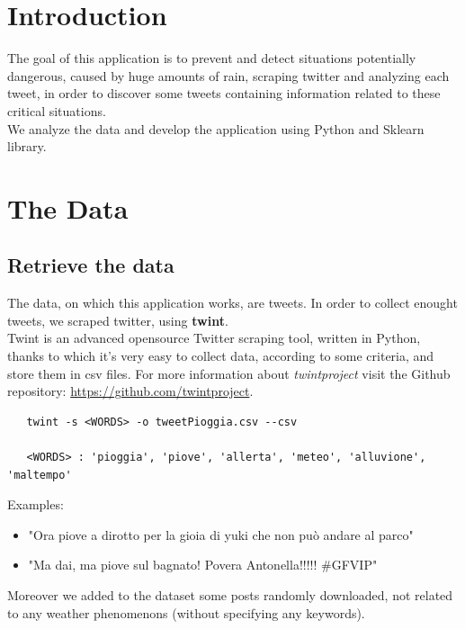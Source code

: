 \documentclass[a4paper]{article}
\begin{document}
\baselineskip 13pt
	
\begin{frontespizio} 
 \Preambolo{\renewcommand{\frontpretitlefont}{\fontsize{15}{12}\scshape}}
\Rientro {1cm}
 \Punteggiatura {}
\end{frontespizio}


\tableofcontents\thispagestyle{empty}
\clearpage


\section{Introduction}
The goal of this application is to prevent and detect situations potentially dangerous, caused by huge amounts of rain, scraping twitter and analyzing each tweet, in order to discover some tweets containing information related to these critical situations.\\
We analyze the data and develop the application using Python and Sklearn library.

\section{The Data}
\subsection{Retrieve the data}
The data, on which this application works, are tweets. In order to collect enought tweets, we scraped twitter, using \textbf{twint}.\\
Twint is an advanced opensource Twitter scraping tool, written in Python, thanks to which it's very easy to collect data, according to some criteria, and store them in csv files.
For more information about \textit{twintproject} visit the Github repository: \url{https://github.com/twintproject}.
\begin{verbatim}
   twint -s <WORDS> -o tweetPioggia.csv --csv

   <WORDS> : 'pioggia', 'piove', 'allerta', 'meteo', 'alluvione', 'maltempo'
\end{verbatim}
Examples:
\begin{itemize}
\item "Ora piove a dirotto per la gioia di yuki che non può andare al parco"
\item "Ma dai, ma piove sul bagnato! Povera Antonella!!!!! \#GFVIP"
\end{itemize}
Moreover we added to the dataset some posts randomly downloaded, not related to any weather phenomenons (without specifying any keywords).
\end{document}

